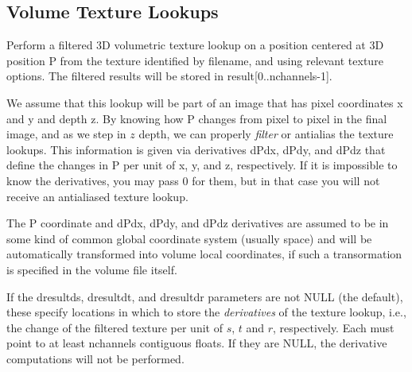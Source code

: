 \subsection{Volume Texture Lookups}
\label{sec:texturesys:api:texture3d}


Perform a filtered 3D volumetric texture lookup on a position centered at
3D position {\cf P} from the texture identified by
{\cf filename}, and using relevant texture {\cf options}.  The filtered
results will be stored in {\cf result[0..nchannels-1]}.

We assume that this lookup will be part of an image that has pixel
coordinates {\cf x} and {\cf y} and depth {\cf z}.  
By knowing how {\cf P} changes from
pixel to pixel in the final image, and as we step in $z$ depth, we can properly \emph{filter} or
antialias the texture lookups.  This information is given via
derivatives {\cf dPdx}, {\cf dPdy}, and {\cf dPdz} that define the changes in {\cf P}
per unit of {\cf x}, {\cf y}, and {\cf z}, respectively.  If it is impossible to
know the derivatives, you may pass 0 for them, but in that case you will
not receive an antialiased texture lookup.

The {\cf P} coordinate and {\cf dPdx}, {\cf dPdy}, and {\cf dPdz}
derivatives are assumed to be in some kind of common global coordinate
system (usually  space) and will be automatically transformed
into volume local coordinates, if such a transormation is specified in
the volume file itself.

If the {\cf dresultds}, {\cf dresultdt}, and  {\cf dresultdr} parameters are
not {\cf NULL} (the default), these specify locations in which to store the
\emph{derivatives} of the texture lookup, i.e., the change of the filtered
texture per unit of $s$, $t$ and $r$, respectively.  Each must point to at least
{\cf nchannels} contiguous floats.  If they are {\cf NULL}, the derivative
computations will not be performed.

